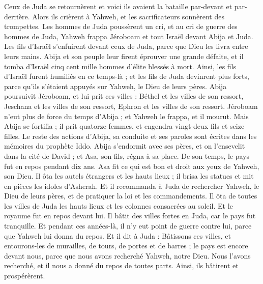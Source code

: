 \begin{multicols}{2}
Ceux de Juda se retournèrent et voici ils avaient la bataille par-devant et par-derrière. Alors ils crièrent à Yahweh, et les sacrificateurs sonnèrent des trompettes.
Les hommes de Juda poussèrent un cri, et au cri de guerre des hommes de Juda, Yahweh frappa Jéroboam et tout Israël devant Abija et Juda.
Les fils d'Israël s'enfuirent devant ceux de Juda, parce que Dieu les livra entre leurs mains.
Abija et son peuple leur firent éprouver une grande défaite, et il tomba d'Israël cinq cent mille hommes d'élite blessés à mort.
Ainsi, les fils d'Israël furent humiliés en ce temps-là ; et les fils de Juda devinrent plus forts, parce qu'ils s'étaient appuyés sur Yahweh, le Dieu de leurs pères.
 Abija poursuivit Jéroboam, et lui prit ces villes : Béthel et les villes de son ressort, Jeschana et les villes de son ressort, Ephron et les villes de son ressort.
Jéroboam n'eut plus de force du temps d'Abija ; et Yahweh le frappa, et il mourut.
Mais Abija se fortifia ; il prit quatorze femmes, et engendra vingt-deux fils et seize filles.
Le reste des actions d'Abija, sa conduite et ses paroles sont écrites dans les mémoires du prophète Iddo.
\VerseOne{}Abija s'endormit avec ses pères, et on l'ensevelit dans la cité de David ; et Asa, son fils, régna à sa place. De son temps, le pays fut en repos pendant dix ans.
Asa fit ce qui est bon et droit aux yeux de Yahweh, son Dieu.
Il ôta les autels étrangers et les hauts lieux ; il brisa les statues et mit en pièces les idoles d'Asherah.
Et il recommanda à Juda de rechercher Yahweh, le Dieu de leurs pères, et de pratiquer la loi et les commandements.
Il ôta de toutes les villes de Juda les hauts lieux et les colonnes consacrées au soleil. Et le royaume fut en repos devant lui.
Il bâtit des villes fortes en Juda, car le pays fut tranquille. Et pendant ces années-là, il n'y eut point de guerre contre lui, parce que Yahweh lui donna du repos.
Et il dit à Juda : Bâtissons ces villes, et entourons-les de murailles, de tours, de portes et de barres ; le pays est encore devant nous, parce que nous avons recherché Yahweh, notre Dieu. Nous l'avons recherché, et il nous a donné du repos de toutes parts. Ainsi, ils bâtirent et prospérèrent.

\end{multicols}
